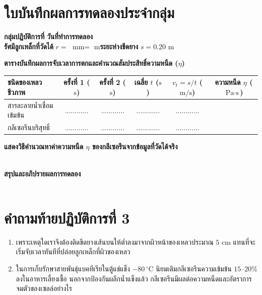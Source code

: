 \section{ใบบันทึกผลการทดลองประจำกลุ่ม}

\begin{worksheetbox}
\noindent\textbf{กลุ่มปฏิบัติการที่} \dotfill \textbf{วันที่ทำการทดลอง} \dotfill\\[4pt]
\noindent\textbf{รัศมีลูกเหล็กที่วัดได้} $r = $ \dotfill $\text{mm} = $ \dotfill $\text{m}$\quad \textbf{ระยะห่างขีดยาง} $s = 0.20\text{ m}$

\vspace{6pt}
\noindent\textbf{ตารางบันทึกผลการจับเวลาการตกและคำนวณสัมประสิทธิ์ความหนืด ($\eta$)}
\begin{center}
\footnotesize\setlength{\tabcolsep}{3.5pt}
\begin{tabularx}{\linewidth}{>{\raggedright\arraybackslash}X c c c c c}
\toprule
\textbf{ชนิดของเหลวชีวภาพ} & \textbf{ครั้งที่ 1 ($\text{s}$)} & \textbf{ครั้งที่ 2 ($\text{s}$)} & \textbf{เฉลี่ย $t$ ($\text{s}$)} & \textbf{$v_t = s/t$ ($\text{m/s}$)} & \textbf{ความหนืด $\eta$ ($\text{Pa}\cdot\text{s}$)} \\
\midrule
สารละลายน้ำเชื่อมเข้มข้น & ............ & ............ & ............ & ............ & \dotfill \\
กลีเซอรีนบริสุทธิ์ & ............ & ............ & ............ & ............ & \dotfill \\
\bottomrule
\end{tabularx}
\end{center}

\vspace{4pt}
\noindent\textbf{แสดงวิธีคำนวณหาค่าความหนืด $\eta$ ของกลีเซอรีนจากข้อมูลที่วัดได้จริง}\\[4pt]
\dotfill\\[6pt]
\dotfill

\noindent\textbf{สรุปและอภิปรายผลการทดลอง}\\[4pt]
\dotfill\\[6pt]
\dotfill
\end{worksheetbox}

\section*{คำถามท้ายปฏิบัติการที่ 3}
\begin{enumerate}
    \item เพราะเหตุใดเราจึงต้องติดขีดยางเส้นบนให้ต่ำลงมาจากผิวหน้าของเหลวประมาณ $5\text{ cm}$ แทนที่จะเริ่มจับเวลาทันทีที่ปล่อยลูกเหล็กที่ผิวของเหลว
    \item ในการเก็บรักษาสายพันธุ์แบคทีเรียในตู้แช่แข็ง $-80\,^\circ\text{C}$ นิยมเติมกลีเซอรีนความเข้มข้น $15\text{--}20\%$ ลงในอาหารเลี้ยงเชื้อ นอกจากป้องกันผลึกน้ำแข็งแล้ว กลีเซอรีนมีผลต่อความหนืดและอัตราการจมตัวของเซลล์อย่างไร
\end{enumerate}
